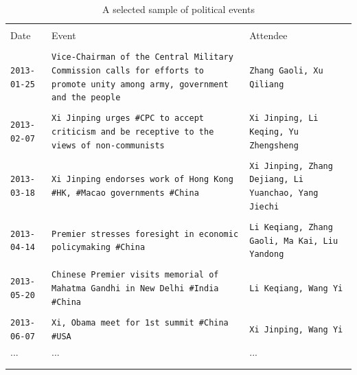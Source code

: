 \documentclass[11pt,english]{article}
\begin{document}
\begin{flushleft}
\noindent \begin{center}
\begin{table}[H]
\caption{A selected sample of political events}
\label{tab:eventDesc}
\centering
\small
\begin{tabular}{p{1in}p{3in}p{2in}}
  \\[-1.8ex]\hline
  \hline \\[-1.8ex]
   Date & Event & Attendee \\    \hline \\[-1.8ex]

  \tt{2013-01-25}  & \tt{Vice-Chairman of the Central Military Commission calls for efforts to promote unity among army, government and the people} & \tt{Zhang Gaoli, Xu Qiliang}\\
    &  &  \\
  \tt{2013-02-07}  & \tt{Xi Jinping urges \#CPC to accept criticism and be receptive to the views of non-communists} & \tt{Xi Jinping, Li Keqing, Yu Zhengsheng}\\
    &  &  \\
   \tt{2013-03-18}  & \tt{Xi Jinping endorses work of Hong Kong \#HK, \#Macao governments \#China} & \tt{Xi Jinping, Zhang Dejiang, Li Yuanchao, Yang Jiechi}\\
    &  &  \\
   \tt{2013-04-14}  & \tt{Premier stresses foresight in economic policymaking \#China} & \tt{Li Keqiang, Zhang Gaoli, Ma Kai, Liu Yandong}\\
    &  &  \\
   \tt{2013-05-20}  & \tt{Chinese Premier visits memorial of Mahatma Gandhi in New Delhi \#India \#China} & \tt{Li Keqiang, Wang Yi}\\
    &  &  \\
   \tt{2013-06-07}  & \tt{Xi, Obama meet for 1st summit \#China \#USA} & \tt{Xi Jinping, Wang Yi}\\
   ... & ...  & ... \\ \\[-1.8ex]     \hline
 \hline \\[-1.8ex]
\end{tabular}
\end{table}
\par\end{center}


\end{flushleft}
\end{document}
